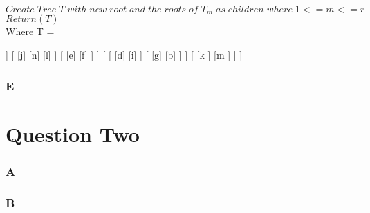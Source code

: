 \documentclass[paper=a4, fontsize=11pt]{scrartcl}
\newcommand\tab[1][1cm]{\hspace*{#1}}
\numberwithin{equation}{section}		%
\numberwithin{figure}{section}			%
\numberwithin{table}{section}				%
\begin{document}
\noindent
\tab$Create\;Tree\;T\;with\;new\;root\;and\;the\;roots\;of\;T_m\;as\;children\;where\;1<=m<=r$\\


\noindent
\tab$Return(T)$\\


\noindent
Where T =
\begin{center}
\begin{forest}
[
	[
		[
			[c]
			[h]
			[a]
		]
		[
			[j]
			[n]
			[l]
		]
		[
			[e]
			[f]
		]
	]
	[
		[
			[d]
			[i]
		]
		[
			[g]
			[b]
		]
	]
	[
		[k
		]
		[m
		]
	]
]
\end{forest}
\end{center}

\subsubsection*{E}

\iffalse
Reverse the Build algorithm, i,e. design an algorithm that takes a tree with labelled leaves
as an input, and produces a set of constraints of the form (i, j) < (k, l), such that when
Build runs on that set, the result is (an isomorphic copy of) the input tree. Prove the
correctness of your algorithm. Also, a smaller output (number of constraints) would give
you a better mark. 
\fi


\section*{Question Two}

\iffalse
This question is about the MinCutSupertree algorithm from  C. Semple and M. Steel. A supertree method for rooted trees. Discrete Applied Mathematics
\fi

\subsubsection*{A}

\iffalse
One of its properties is that it preserves nesting and subtrees that are shared
by all of the input trees. Point where precisely in the algorithm this property
is achieved.
\fi



\subsubsection*{B}

\iffalse
Argue that the MinCutSupertree algorithm is a generalisation of the Build
algorithm, i.e. show how to encode a constraint from the inputs of the later as
a tree, which is one of the inputs of the former.
\fi

\end{document}
